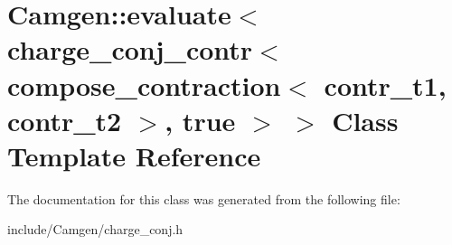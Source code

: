 \hypertarget{a00143}{}\section{Camgen\+:\+:evaluate$<$ charge\+\_\+conj\+\_\+contr$<$ compose\+\_\+contraction$<$ contr\+\_\+t1, contr\+\_\+t2 $>$, true $>$ $>$ Class Template Reference}
\label{a00143}


The documentation for this class was generated from the following file\+:\begin{DoxyCompactItemize}
\item 
include/\+Camgen/charge\+\_\+conj.\+h\end{DoxyCompactItemize}

